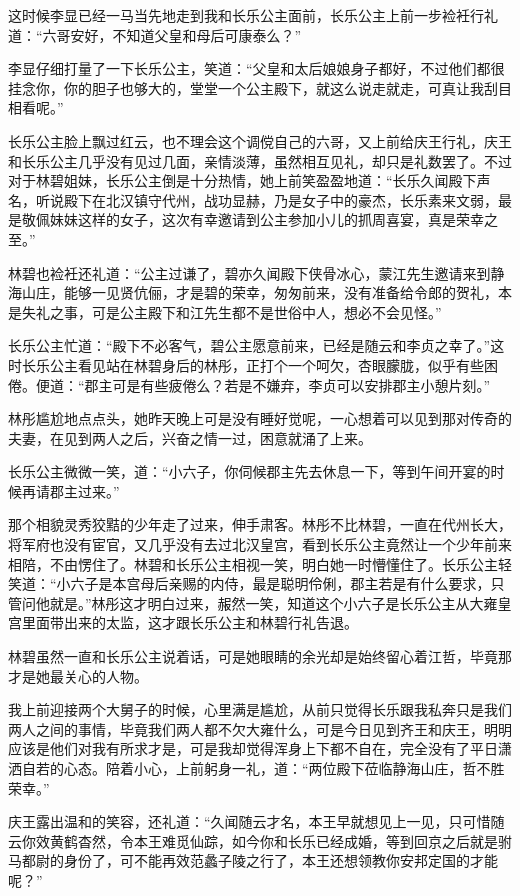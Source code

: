这时候李显已经一马当先地走到我和长乐公主面前，长乐公主上前一步裣衽行礼道：“六哥安好，不知道父皇和母后可康泰么？”

李显仔细打量了一下长乐公主，笑道：“父皇和太后娘娘身子都好，不过他们都很挂念你，你的胆子也够大的，堂堂一个公主殿下，就这么说走就走，可真让我刮目相看呢。”

长乐公主脸上飘过红云，也不理会这个调傥自己的六哥，又上前给庆王行礼，庆王和长乐公主几乎没有见过几面，亲情淡薄，虽然相互见礼，却只是礼数罢了。不过对于林碧姐妹，长乐公主倒是十分热情，她上前笑盈盈地道：“长乐久闻殿下声名，听说殿下在北汉镇守代州，战功显赫，乃是女子中的豪杰，长乐素来文弱，最是敬佩妹妹这样的女子，这次有幸邀请到公主参加小儿的抓周喜宴，真是荣幸之至。”

林碧也裣衽还礼道：“公主过谦了，碧亦久闻殿下侠骨冰心，蒙江先生邀请来到静海山庄，能够一见贤伉俪，才是碧的荣幸，匆匆前来，没有准备给令郎的贺礼，本是失礼之事，可是公主殿下和江先生都不是世俗中人，想必不会见怪。”

长乐公主忙道：“殿下不必客气，碧公主愿意前来，已经是随云和李贞之幸了。”这时长乐公主看见站在林碧身后的林彤，正打个一个呵欠，杏眼朦胧，似乎有些困倦。便道：“郡主可是有些疲倦么？若是不嫌弃，李贞可以安排郡主小憩片刻。”

林彤尴尬地点点头，她昨天晚上可是没有睡好觉呢，一心想着可以见到那对传奇的夫妻，在见到两人之后，兴奋之情一过，困意就涌了上来。

长乐公主微微一笑，道：“小六子，你伺候郡主先去休息一下，等到午间开宴的时候再请郡主过来。”

那个相貌灵秀狡黠的少年走了过来，伸手肃客。林彤不比林碧，一直在代州长大，将军府也没有宦官，又几乎没有去过北汉皇宫，看到长乐公主竟然让一个少年前来相陪，不由愣住了。林碧和长乐公主相视一笑，明白她一时懵懂住了。长乐公主轻笑道：“小六子是本宫母后亲赐的内侍，最是聪明伶俐，郡主若是有什么要求，只管问他就是。”林彤这才明白过来，赧然一笑，知道这个小六子是长乐公主从大雍皇宫里面带出来的太监，这才跟长乐公主和林碧行礼告退。

林碧虽然一直和长乐公主说着话，可是她眼睛的余光却是始终留心着江哲，毕竟那才是她最关心的人物。

我上前迎接两个大舅子的时候，心里满是尴尬，从前只觉得长乐跟我私奔只是我们两人之间的事情，毕竟我们两人都不欠大雍什么，可是今日见到齐王和庆王，明明应该是他们对我有所求才是，可是我却觉得浑身上下都不自在，完全没有了平日潇洒自若的心态。陪着小心，上前躬身一礼，道：“两位殿下莅临静海山庄，哲不胜荣幸。”

庆王露出温和的笑容，还礼道：“久闻随云才名，本王早就想见上一见，只可惜随云你效黄鹤杳然，令本王难觅仙踪，如今你和长乐已经成婚，等到回京之后就是驸马都尉的身份了，可不能再效范蠡子陵之行了，本王还想领教你安邦定国的才能呢？”

